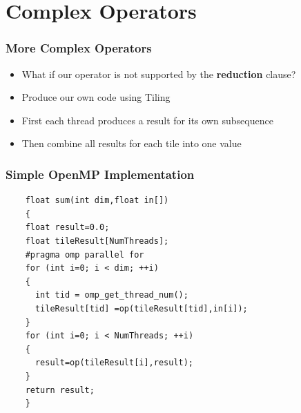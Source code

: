 \documentclass{beamer}
\begin{document}
  \section{Complex Operators}
\begin{frame}
	\frametitle{More Complex Operators}
\begin{itemize}
\item What if our operator is not supported by the \textbf{reduction} clause?

\item Produce our own code using Tiling

\item First each thread produces a result for its own subsequence

\item Then combine all results for each tile into one value
\end{itemize}
\end{frame}
  \begin{frame}[fragile=singleslide]
  	\frametitle{Simple OpenMP Implementation}
  	\begin{lstlisting}
  	float sum(int dim,float in[])
  	{
  	float result=0.0;
  	float tileResult[NumThreads];
  	#pragma omp parallel for
  	for (int i=0; i < dim; ++i)
  	{
  	  int tid = omp_get_thread_num();
  	  tileResult[tid] =op(tileResult[tid],in[i]);
  	}
  	for (int i=0; i < NumThreads; ++i)
  	{
  	  result=op(tileResult[i],result);
  	}
  	return result;
  	}
  	\end{lstlisting}
  \end{frame}
  
\end{document}
